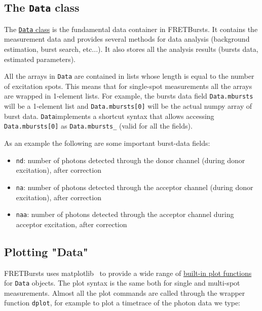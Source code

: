 \subsection{The \texttt{Data} class}
\label{sec:data_intro}

The
\href{http://fretbursts.readthedocs.org/en/latest/data_class.html}{\texttt{Data}
class} is the fundamental data container in FRETBursts. It contains the
measurement data and provides several methods for data analysis (background
estimation, burst search, etc...). It also stores all the analysis results
(bursts data, estimated parameters).

All the arrays in \texttt{Data} are contained in lists whose length is equal to the
number of excitation spots. This means that for single-spot measurements all the
arrays are wrapped in 1-element lists. For example, the bursts data field
\verb|Data.mbursts| will be a 1-element list and \verb|Data.mbursts[0]| will be
the actual numpy array of burst data. \verb|Data|implements a shortcut syntax
that allows accessing 
\verb|Data.mbursts[0]| as \verb|Data.mbursts_| (valid for all the fields).

As an example the following are some important burst-data fields:

\begin{itemize}
\item \verb|nd|: number of photons detected through the donor channel (during
donor excitation), after correction
\item \verb|na|: number of photons detected through the acceptor channel (during
donor excitation), after correction
\item \verb|naa|: number of photons detected through the acceptor channel during
acceptor excitation, after correction
\end{itemize}

\subsection{Plotting "Data"}

FRETBursts uses matplotlib~\cite{2096e2a4-8f50-4519-bfb3-f796da201630} to
provide a wide range of 
\href{http://fretbursts.readthedocs.org/en/latest/plots.html}{built-in plot functions}
for \verb|Data| objects. 
The plot syntax is the same both for single and multi-spot measurements. 
Almost all the plot commands are called through the wrapper function 
\verb|dplot|, for example to plot a timetrace of the photon data we type:

